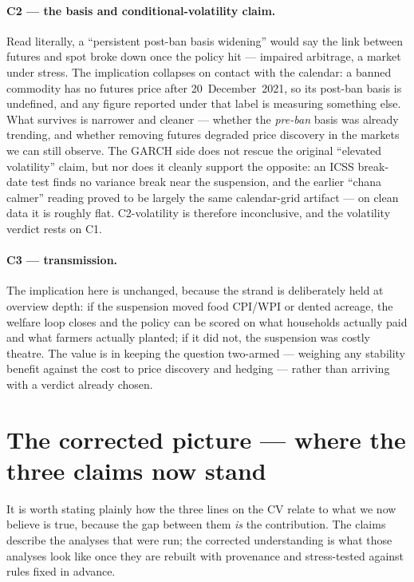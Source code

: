 \documentclass[11pt]{article}
\begin{document}
\paragraph{C2 --- the basis and conditional-volatility claim.} Read literally, a ``persistent
post-ban basis widening'' would say the link between futures and spot broke down once the
policy hit --- impaired arbitrage, a market under stress. The implication collapses on
contact with the calendar: a banned commodity has no futures price after 20~December~2021, so
its post-ban basis is undefined, and any figure reported under that label is measuring
something else. What survives is narrower and cleaner --- whether the \emph{pre-ban} basis was
already trending, and whether removing futures degraded price discovery in the markets we can
still observe. The GARCH side does not rescue the original ``elevated volatility'' claim, but
nor does it cleanly support the opposite: an ICSS break-date test finds no variance break near
the suspension, and the earlier ``chana calmer'' reading proved to be largely the same
calendar-grid artifact --- on clean data it is roughly flat. C2-volatility is therefore
inconclusive, and the volatility verdict rests on C1.

\paragraph{C3 --- transmission.} The implication here is unchanged, because the strand is
deliberately held at overview depth: if the suspension moved food CPI/WPI or dented acreage,
the welfare loop closes and the policy can be scored on what households actually paid and what
farmers actually planted; if it did not, the suspension was costly theatre. The value is in
keeping the question two-armed --- weighing any stability benefit against the cost to price
discovery and hedging --- rather than arriving with a verdict already chosen.

\section{The corrected picture --- where the three claims now stand}
It is worth stating plainly how the three lines on the CV relate to what we now believe is
true, because the gap between them \emph{is} the contribution. The claims describe the
analyses that were run; the corrected understanding is what those analyses look like once they
are rebuilt with provenance and stress-tested against rules fixed in advance.
\end{document}
